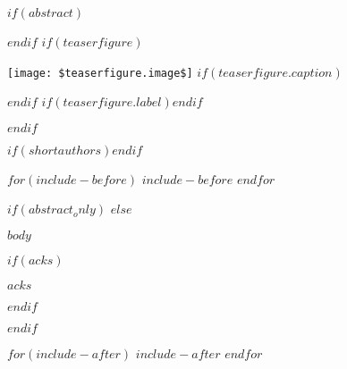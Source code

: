 \documentclass[$for(classoption)$$classoption$$sep$,$endfor$]{acmart}
\author{$author.name$}
\affiliation{%
    $if(author.affiliation.position)$\position{$author.affiliation.position$}$endif$%
    $if(author.affiliation.institution)$\institution{$author.affiliation.institution$}$endif$%
    $for(author.affiliation.department)$\department{$author.affiliation.department$}$endfor$%
    $if(author.affiliation.streetaddress)$\streetaddress{$author.affiliation.streetaddress$}$endif$%
    $if(author.affiliation.city)$\city{$author.affiliation.city$}$endif$%
    $if(author.affiliation.state)$\state{$author.affiliation.state$}$endif$%
    $if(author.affiliation.postcode)$\postcode{$author.affiliation.postcode$}$endif$%
    $if(author.affiliation.country)$\country{$author.affiliation.country$}$endif$%
    }
\begin{document}
$if(abstract)$\begin{abstract}$abstract$\end{abstract}$endif$
$if(teaserfigure)$
  \begin{teaserfigure}
    \texttt{[image: \$teaserfigure.image\$]}
    $if(teaserfigure.caption)$\caption{$teaserfigure.caption$}$endif$
    $if(teaserfigure.label)$\label{$teaserfigure.label$}$endif$
  \end{teaserfigure}
$endif$

\maketitle

$if(shortauthors)$\renewcommand{\shortauthors}{$shortauthors$}$endif$

$for(include-before)$
$include-before$
$endfor$

$if(abstract_only)$
$else$

$body$

$if(acks)$\begin{acks}$acks$\end{acks}$endif$

\printbibliography

% 
% 

$endif$

$for(include-after)$
$include-after$
$endfor$
\end{document}
